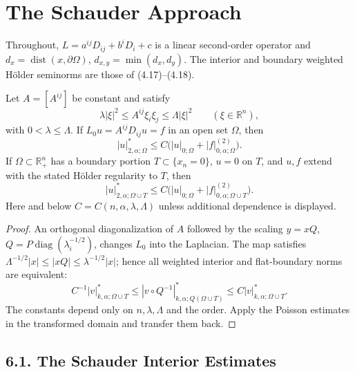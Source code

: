 \chapter{The Schauder Approach}

Throughout, $L=a^{ij}D_{ij}+b^iD_i+c$ is a linear second-order operator and
$d_x=\operatorname{dist}(x,\partial\Omega)$, $d_{x,y}=\min(d_x,d_y)$.  The
interior and boundary weighted H\"older seminorms are those of (4.17)--(4.18).

\begin{lemma}
\label{gt-ch06-lem-6-1}
Let $A=[A^{ij}]$ be constant and satisfy
\[
\lambda|\xi|^2\le A^{ij}\xi_i\xi_j\le\Lambda|\xi|^2\qquad(\xi\in\mathbb R^n),
\]
with $0<\lambda\le\Lambda$.  If $L_0u=A^{ij}D_{ij}u=f$ in an open set
$\Omega$, then
\begin{equation}\tag{6.4}
|u|_{2,\alpha;\Omega}^*\le C\bigl(|u|_{0;\Omega}+|f|_{0,\alpha;\Omega}^{(2)}\bigr).
\end{equation}
If $\Omega\subset\mathbb R^n_+$ has a boundary portion $T\subset\{x_n=0\}$,
$u=0$ on $T$, and $u,f$ extend with the stated H\"older regularity to $T$, then
\begin{equation}\tag{6.5}
|u|_{2,\alpha;\Omega\cup T}^*\le C\bigl(|u|_{0;\Omega}+|f|_{0,\alpha;\Omega\cup T}^{(2)}\bigr).
\end{equation}
Here and below $C=C(n,\alpha,\lambda,\Lambda)$ unless additional dependence is
displayed.
\end{lemma}
\begin{proof}
\sketch An orthogonal diagonalization of $A$ followed by the scaling
$y=xQ$, $Q=P\operatorname{diag}(\lambda_i^{-1/2})$, changes $L_0$ into the
Laplacian.  The map satisfies
$\Lambda^{-1/2}|x|\le|xQ|\le\lambda^{-1/2}|x|$; hence all weighted interior
and flat-boundary norms are equivalent:
\begin{equation}
\tag{6.7}
C^{-1}|v|^*_{k,\alpha;\Omega\cup T}
\leq|v\circ Q^{-1}|^*_{k,\alpha;Q(\Omega\cup T)}
\leq C|v|^*_{k,\alpha;\Omega\cup T}.
\end{equation}
The constants depend only on
$n,\lambda,\Lambda$ and the order.  Apply the Poisson estimates in the
transformed domain and transfer them back.
\end{proof}

\section*{6.1. The Schauder Interior Estimates}

